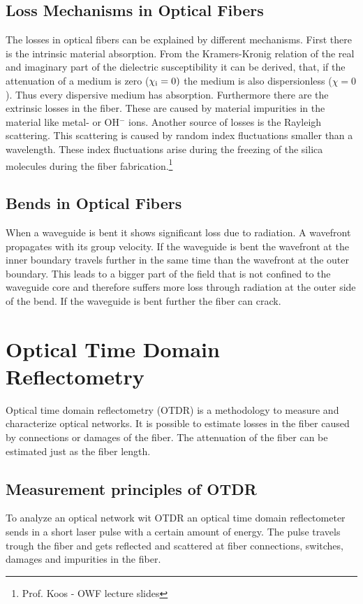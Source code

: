 \subsection{Loss Mechanisms in Optical Fibers}
\label{loss}
The losses in optical fibers can be explained by different mechanisms. First there is the intrinsic material absorption. From the Kramers-Kronig relation of the real and imaginary part of the dielectric susceptibility it can be derived, that, if the attenuation of a medium is zero ($\chi_{\mathrm{i}}=0)$ the medium is also dispersionless ($\chi=0$). Thus every dispersive medium has absorption. Furthermore there are the extrinsic losses in the fiber. These are caused by material impurities in the material like metal- or OH$^-$ ions. Another source of losses is the Rayleigh scattering. This scattering is caused by random index fluctuations smaller than a wavelength. These index fluctuations arise during the freezing of the silica molecules during the fiber fabrication.\footnote[1]{Prof. Koos - OWF lecture slides}

\subsection{Bends in Optical Fibers}
\label{bend_loss}

When a waveguide is bent it shows significant loss due to radiation. A wavefront propagates with its group velocity. If the waveguide is bent the wavefront at the inner boundary travels further in the same time than the wavefront at the outer boundary. This leads to a bigger part of the field that is not confined to the waveguide core and therefore suffers more loss through radiation at the outer side of the bend. If the waveguide is bent further the fiber can crack.\footnotemark[1]%


\section{Optical Time Domain Reflectometry}
Optical time domain reflectometry (OTDR) is a methodology to measure and characterize optical networks. It is possible to estimate losses in the fiber caused by connections or damages of the fiber. The attenuation of the fiber can be estimated just as the fiber length.

\subsection{Measurement principles of OTDR}
\label{subsec:Principle}
To analyze an optical network wit OTDR an optical time domain reflectometer sends in a short laser pulse with a certain amount of energy. The pulse travels trough the fiber and gets reflected and scattered at fiber connections, switches, damages and impurities in the fiber. 

